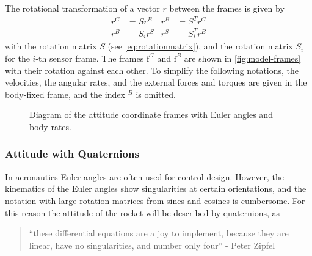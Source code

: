 The rotational transformation of a vector $r$ between the frames is given by
\begin{align}
    r^G &= S r^B & r^B &= S^T r^G \\
    r^B &= S_i r^{S} & r^{S} &= S_i^T r^B 
\end{align}
with the rotation matrix $S$ (see \autoref{eq:rotationmatrix}), and the rotation matrix $S_i$ for the $i$-th sensor frame.
The frames $\mathrm{f}^G$ and $\mathrm{f}^B$ are shown in \autoref{fig:model-frames} with their rotation against each other.
To simplify the following notations, the velocities, the angular rates, and the external forces and torques are given in the body-fixed frame, and the index $^B$ is omitted.  
\begin{figure}[ht]
    \centering
    \resizebox{0.36\textwidth}{!}{
    }
    \caption[Diagram of attitude frames]{Diagram of the attitude coordinate frames with Euler angles and body rates.}
    \label{fig:model-frames}
\end{figure}


\subsubsection{Attitude with Quaternions}
In aeronautics Euler angles are often used for control design.
However, the kinematics of the Euler angles show singularities at certain orientations, and the notation with large rotation matrices from sines and cosines is cumbersome.
For this reason the attitude of the rocket will be described by quaternions, as
\begin{quote}
``these differential equations are a joy to implement, because they are linear, have no singularities, and number only four'' - Peter Zipfel \cite{zipfel2007}
\end{quote}

